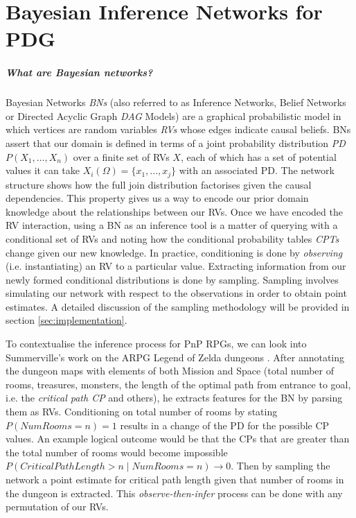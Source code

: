 \documentclass{UoYCSproject}
\begin{document}
\chapter{Bayesian Inference Networks for PDG}
\label{ch:BNETS}
\paragraph{What are Bayesian networks?}
Bayesian Networks \textit{BNs} \parencite{pearl1985bayesian} (also referred to as Inference Networks, Belief Networks or Directed Acyclic Graph \textit{DAG} Models) are a graphical probabilistic model in which vertices are random variables \textit{RVs} whose edges indicate causal beliefs. BNs assert that our domain is defined in terms of a joint probability distribution \textit{PD} \(P(X_1, \ldots , X_n)\) over a finite set of RVs \(X\), each of which has a set of potential values it can take \(X_i(\Omega) = \{x_1, \ldots, x_j\}\) with an associated PD. The network structure shows how the full join distribution factorises given the causal dependencies. This property gives us a way to encode our prior domain knowledge about the relationships between our RVs.
Once we have encoded the RV interaction, using a BN as an inference tool is a matter of querying with a conditional set of RVs and noting how the conditional probability tables \textit{CPTs} change given our new knowledge. In practice, conditioning is done by \textit{observing} (i.e. instantiating) an RV to a particular value. Extracting information from our newly formed conditional distributions is done by sampling. Sampling involves simulating our network with respect to the observations in order to obtain point estimates. A detailed discussion of the sampling methodology will be provided in section \ref{sec:implementation}.

To contextualise the inference process for PnP RPGs, we can look into Summerville's work on the ARPG Legend of Zelda dungeons \parencite{SummervilleLearningOfZelda}. After annotating the dungeon maps with elements of both Mission and Space (total number of rooms, treasures, monsters, the length of the optimal path from entrance to goal, i.e. the \textit{critical path CP} and others), he extracts features for the BN by parsing them as RVs. Conditioning on total number of rooms by stating \(P(NumRooms = n) = 1\) results in a change of the PD for the possible CP values. An example logical outcome would be that the CPs that are greater than the total number of rooms would become impossible \(P(CriticalPathLength > n \mid NumRooms = n) \rightarrow 0 \). Then by sampling the network a point estimate for critical path length given that number of rooms in the dungeon is extracted. This \textit{observe-then-infer} process can be done with any permutation of our RVs.
\end{document}
